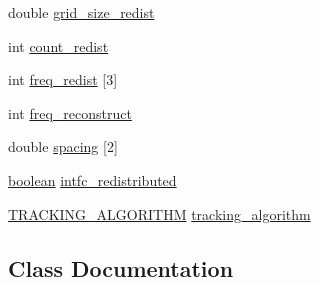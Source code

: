 \begin{DoxyCompactItemize}
double \hyperlink{struct___r_e_d_i_s_t___c_o_n_t_r_o_l_ac6d4771a22b65dafa1e6cea32a20eac5}{grid\+\_\+size\+\_\+redist}
\item 
int \hyperlink{struct___r_e_d_i_s_t___c_o_n_t_r_o_l_a129b9f40a09b3924965356615dd80c79}{count\+\_\+redist}
\item 
int \hyperlink{struct___r_e_d_i_s_t___c_o_n_t_r_o_l_a61e58790f312430288bee979c83ec4d5}{freq\+\_\+redist} \mbox{[}3\mbox{]}
\item 
int \hyperlink{struct___r_e_d_i_s_t___c_o_n_t_r_o_l_a8426f8dc7daf547b7455753fe4805340}{freq\+\_\+reconstruct}
\item 
double \hyperlink{struct___r_e_d_i_s_t___c_o_n_t_r_o_l_ad0228418bfaa05a072aaebd4a0374cb1}{spacing} \mbox{[}2\mbox{]}
\item 
\hyperlink{cdecs_8h_ad048433382a936258fb49e2ec4f148e1}{boolean} \hyperlink{struct___r_e_d_i_s_t___c_o_n_t_r_o_l_ab7f796e838883e007218cae3261504a2}{intfc\+\_\+redistributed}
\item 
\hyperlink{fdecs_8h_a762a533b4685c7569a723fde13372950}{T\+R\+A\+C\+K\+I\+N\+G\+\_\+\+A\+L\+G\+O\+R\+I\+T\+HM} \hyperlink{struct___r_e_d_i_s_t___c_o_n_t_r_o_l_a95bacf880becf1b4a99976f595b10838}{tracking\+\_\+algorithm}
\end{DoxyCompactItemize}


\subsection{Class Documentation}
\label{struct___r_e_d_i_s_t___c_o_n_t_r_o_l_1_1___c_u_r_v_e___r_e_d_i_s_t_r_i_b_u_t_e}
\hypertarget{struct___r_e_d_i_s_t___c_o_n_t_r_o_l_struct___r_e_d_i_s_t___c_o_n_t_r_o_l_1_1___c_u_r_v_e___r_e_d_i_s_t_r_i_b_u_t_e}{}
